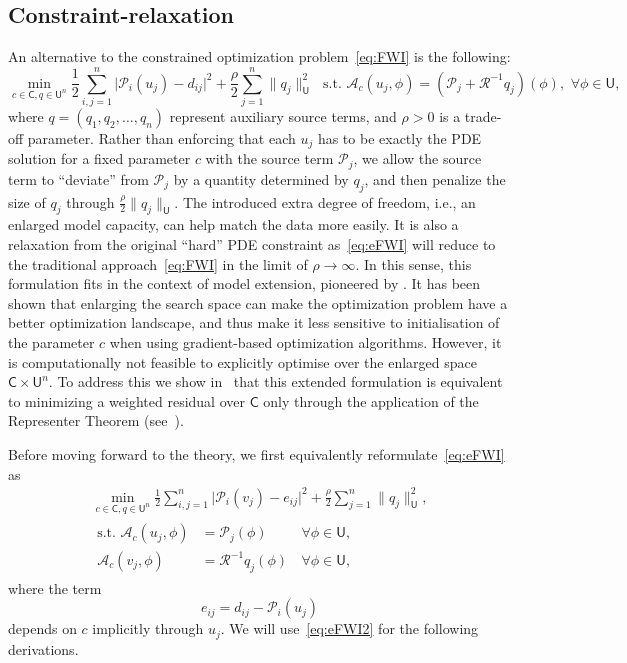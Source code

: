 \documentclass[12pt]{amsart}
\newcommand{\U}{\mathsf{U}}
\begin{document}
\subsection{Constraint-relaxation}
An alternative to the constrained optimization problem~\eqref{eq:FWI} is the following:
\begin{equation}\label{eq:eFWI}
\min_{c\in\mathsf{C},q\in\mathsf{U}^n}   {\textstyle\frac{1}{2}} \sum_{i,j=1}^{n}   \big|\mathcal{P}_i(u_j) - d_{ij}\big|^2 +   {\textstyle\frac{\rho}{2}} \sum_{j=1}^n  \|q_j\|_{\mathsf{U}}^2\,\,\,\,\text{s.t.}\,\,\mathcal{A}_c(u_j,\phi) = \left(\mathcal{P}_j + \mathcal{R}^{-1}q_j\right)(\phi),\,\,\forall\phi\in \mathsf{U},
 \end{equation}
where $q = (q_1, q_2, \ldots, q_n)$ represent auxiliary source terms, and $\rho > 0$ is a trade-off parameter. Rather than enforcing that each $u_j$ has to be exactly the PDE solution for a fixed parameter $c$ with the source term $\mathcal{P}_j$, we allow the source term to ``deviate'' from $\mathcal{P}_j$ by a quantity determined by $q_j$, and then penalize the size of $q_j$ through $\frac{\rho}{2} \|q_j\|_\U$. The introduced extra degree of freedom, i.e., an enlarged model capacity,  can help match the data more easily. It is also a relaxation from the original ``hard'' PDE constraint as~\eqref{eq:eFWI} will reduce to the traditional approach~\eqref{eq:FWI} in the limit of $\rho\rightarrow \infty$. In this sense, this formulation fits in the context of model extension, pioneered by \cite{Symes2014,Symes2020,Symes2020a,Warner2016}. It has been shown that enlarging the search space can make the optimization problem have a better optimization landscape, and thus make it less sensitive to initialisation of the parameter $c$ when using gradient-based optimization algorithms. However, it is computationally not feasible to explicitly optimise over the enlarged space $\mathsf{C}\times \mathsf{U}^n$. To address this we show in~ that this extended formulation is equivalent to minimizing a weighted residual over $\mathsf{C}$ only through the application of the Representer Theorem (see~).

Before moving forward to the theory, we first equivalently reformulate~\eqref{eq:eFWI} as
\begin{eqnarray}\label{eq:eFWI2}
\min_{c\in\mathsf{C},q\in\mathsf{U}^n}  {\textstyle\frac{1}{2}} \sum_{i,j=1}^{n}   \big|\mathcal{P}_i(v_j) - e_{ij}\big|^2 +   {\textstyle\frac{\rho}{2}} \sum_{j=1}^n  \|q_j\|_{\mathsf{U}}^2,\\
 \begin{split}
\text{s.t.}\,\,\mathcal{A}_c(u_j,\phi) &= \mathcal{P}_j(\phi)\,&\forall\phi\in \mathsf{U},\nonumber\\
\mathcal{A}_c(v_j,\phi) &= \mathcal{R}^{-1}q_j(\phi)\,&\forall\phi\in \mathsf{U},\nonumber
 \end{split}
 \end{eqnarray}
where the term 
\begin{equation}\label{eq:new_error}
    e_{ij} = d_{ij} - \mathcal{P}_i(u_j)
\end{equation}
depends on $c$ implicitly through $u_j$. We will use~\eqref{eq:eFWI2} for the following derivations.
\end{document}
